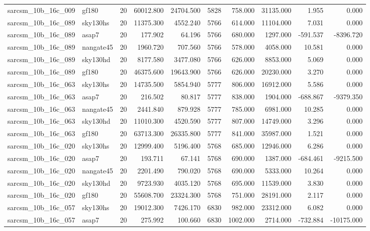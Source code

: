 \documentclass{article}
\begin{document}
\begin{longtable}{llrrrrrrrr}
sarcsm\_10b\_16c\_009 & gf180 & 20 & 60012.800 & 24704.500 & 5828 & 758.000 & 31135.000 & 1.955 & 0.000 \\
sarcsm\_10b\_16c\_089 & sky130hs & 20 & 11375.300 & 4552.240 & 5766 & 614.000 & 11104.000 & 7.031 & 0.000 \\
sarcsm\_10b\_16c\_089 & asap7 & 20 & 177.902 & 64.196 & 5766 & 680.000 & 1297.000 & -591.537 & -8396.720 \\
sarcsm\_10b\_16c\_089 & nangate45 & 20 & 1960.720 & 707.560 & 5766 & 578.000 & 4058.000 & 10.581 & 0.000 \\
sarcsm\_10b\_16c\_089 & sky130hd & 20 & 8177.580 & 3477.080 & 5766 & 626.000 & 8853.000 & 5.069 & 0.000 \\
sarcsm\_10b\_16c\_089 & gf180 & 20 & 46375.600 & 19643.900 & 5766 & 626.000 & 20230.000 & 3.270 & 0.000 \\
sarcsm\_10b\_16c\_063 & sky130hs & 20 & 14735.500 & 5854.940 & 5777 & 806.000 & 16912.000 & 5.586 & 0.000 \\
sarcsm\_10b\_16c\_063 & asap7 & 20 & 216.502 & 80.817 & 5777 & 838.000 & 1904.000 & -688.867 & -9379.350 \\
sarcsm\_10b\_16c\_063 & nangate45 & 20 & 2441.840 & 879.928 & 5777 & 785.000 & 6981.000 & 10.285 & 0.000 \\
sarcsm\_10b\_16c\_063 & sky130hd & 20 & 11010.300 & 4520.590 & 5777 & 807.000 & 14749.000 & 3.296 & 0.000 \\
sarcsm\_10b\_16c\_063 & gf180 & 20 & 63713.300 & 26335.800 & 5777 & 841.000 & 35987.000 & 1.521 & 0.000 \\
sarcsm\_10b\_16c\_020 & sky130hs & 20 & 12999.400 & 5196.400 & 5768 & 685.000 & 12946.000 & 6.286 & 0.000 \\
sarcsm\_10b\_16c\_020 & asap7 & 20 & 193.711 & 67.141 & 5768 & 690.000 & 1387.000 & -684.461 & -9215.500 \\
sarcsm\_10b\_16c\_020 & nangate45 & 20 & 2201.490 & 790.020 & 5768 & 690.000 & 5333.000 & 10.264 & 0.000 \\
sarcsm\_10b\_16c\_020 & sky130hd & 20 & 9723.930 & 4035.120 & 5768 & 695.000 & 11539.000 & 3.830 & 0.000 \\
sarcsm\_10b\_16c\_020 & gf180 & 20 & 55608.700 & 23324.300 & 5768 & 751.000 & 28191.000 & 2.117 & 0.000 \\
sarcsm\_10b\_16c\_057 & sky130hs & 20 & 19012.300 & 7426.170 & 6830 & 982.000 & 23312.000 & 6.082 & 0.000 \\
sarcsm\_10b\_16c\_057 & asap7 & 20 & 275.992 & 100.660 & 6830 & 1002.000 & 2714.000 & -732.884 & -10175.000 \\

\end{longtable}
\end{document}
